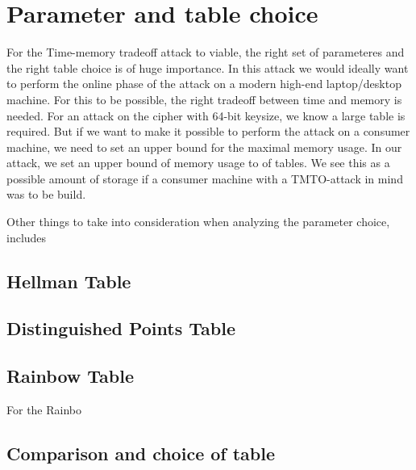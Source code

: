 \chapter{Parameter and table choice}
\label{ch:param}
For the Time-memory tradeoff attack to viable, the right set of
parameteres and the right table choice is of huge importance. In this
attack we would ideally want to perform the online phase of the  attack on a modern
high-end laptop/desktop machine. For this to be possible, the right
tradeoff between time and memory is needed. For an attack on the
cipher with 64-bit keysize, we know a large table is required. But if
we want to make it possible to perform the attack on a consumer
machine, we need to set an upper bound for the maximal memory
usage. In our attack, we set an upper bound of memory usage to
 of tables. We see this as a possible amount of storage if a
consumer machine with a TMTO-attack in mind was to be build.

Other things to take into consideration when analyzing the parameter
choice, includes 

\section{Hellman Table}



\section{Distinguished Points Table}



\section{Rainbow Table}

For the Rainbo

\section{Comparison and choice of table}

